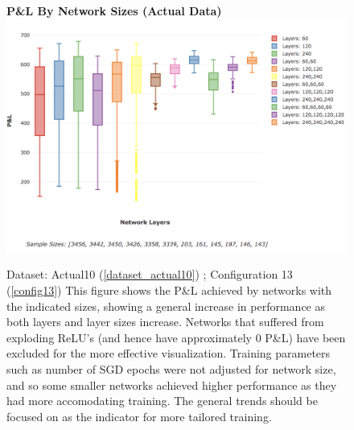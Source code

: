 \documentclass[a4paper,11pt,oneside]{article}
\theoremstyle{plain}
\theoremstyle{definition}
\begin{document}
	\begin{figure}[H]
		\centering 
		\textbf{P\&L By Network Sizes (Actual Data)}
		\includegraphics[scale=0.3]{images/results/network/actual_pl_box.png} 
		\caption[P\&L By Network Sizes (Actual Data)]{Dataset: Actual10 (\ref{dataset_actual10}) ; Configuration 13 (\ref{config13})
			\newline This figure shows the P\&L achieved by networks with the indicated sizes, showing a general increase in performance as both layers and layer sizes increase. Networks that suffered from exploding ReLU's (and hence have approximately 0 P\&L) have been excluded for the more effective visualization. Training parameters such as number of SGD epochs were not adjusted for network size, and so some smaller networks achieved higher performance as they had more accomodating training. The general trends should be focused on as the indicator for more tailored training.}
		\label{figure-results_actual_pl_box}
	\end{figure}
	
\end{document}
